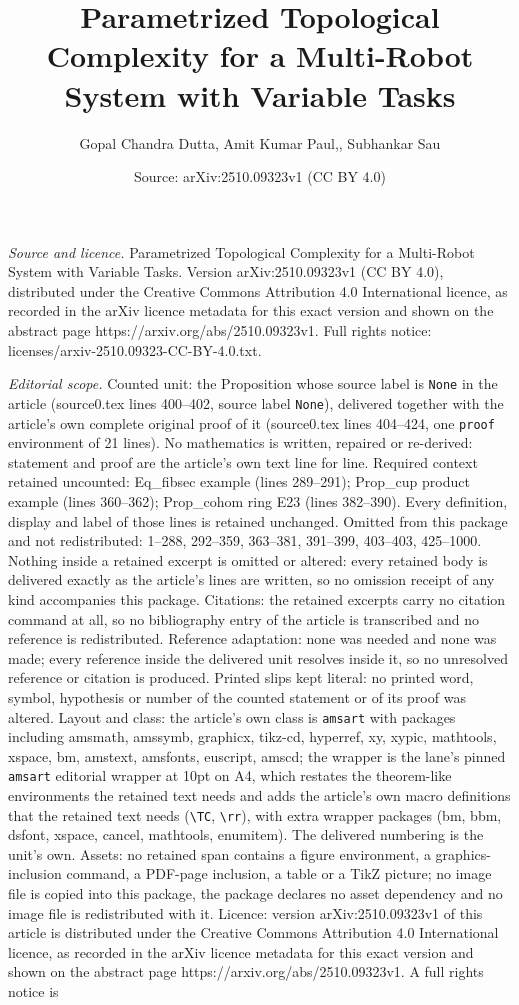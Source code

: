 \documentclass[10pt,a4paper]{amsart}
\title[Parametrized Topological Complexity for a Multi-Robot System]{Parametrized Topological Complexity for a Multi-Robot System with Variable Tasks}
\author{Gopal Chandra Dutta, Amit Kumar Paul,, Subhankar Sau}
\date{Source: arXiv:2510.09323v1 (CC BY 4.0)}
\begin{document}
\maketitle

\noindent\emph{Source and licence.} Parametrized Topological Complexity for a Multi-Robot System with Variable Tasks. Version arXiv:2510.09323v1 (CC BY 4.0), distributed under the Creative Commons Attribution 4.0 International licence, as recorded in the arXiv licence metadata for this exact version and shown on the abstract page https://arxiv.org/abs/2510.09323v1. Full rights notice: licenses/arxiv-2510.09323-CC-BY-4.0.txt.\par\smallskip

\noindent\textit{Editorial scope.} Counted unit: the Proposition whose source label is \texttt{None} in the article (source0.tex lines 400--402, source label \texttt{None}), delivered together with the article's own complete original proof of it (source0.tex lines 404--424, one \texttt{proof} environment of 21 lines). No mathematics is written, repaired or re-derived: statement and proof are the article's own text line for line. Required context retained uncounted: Eq\_fibsec example (lines 289--291); Prop\_cup product example (lines 360--362); Prop\_cohom ring E23 (lines 382--390). Every definition, display and label of those lines is retained unchanged. Omitted from this package and not redistributed: 1--288, 292--359, 363--381, 391--399, 403--403, 425--1000. Nothing inside a retained excerpt is omitted or altered: every retained body is delivered exactly as the article's lines are written, so no omission receipt of any kind accompanies this package. Citations: the retained excerpts carry no citation command at all, so no bibliography entry of the article is transcribed and no reference is redistributed. Reference adaptation: none was needed and none was made; every reference inside the delivered unit resolves inside it, so no unresolved reference or citation is produced. Printed slips kept literal: no printed word, symbol, hypothesis or number of the counted statement or of its proof was altered. Layout and class: the article's own class is \texttt{amsart} with packages including amsmath, amssymb, graphicx, tikz-cd, hyperref, xy, xypic, mathtools, xspace, bm, amstext, amsfonts, euscript, amscd; the wrapper is the lane's pinned \texttt{amsart} editorial wrapper at 10pt on A4, which restates the theorem-like environments the retained text needs and adds the article's own macro definitions that the retained text needs (\texttt{\textbackslash TC}, \texttt{\textbackslash rr}), with extra wrapper packages (bm, bbm, dsfont, xspace, cancel, mathtools, enumitem). The delivered numbering is the unit's own. Assets: no retained span contains a figure environment, a graphics-inclusion command, a PDF-page inclusion, a table or a TikZ picture; no image file is copied into this package, the package declares no asset dependency and no image file is redistributed with it. Licence: version arXiv:2510.09323v1 of this article is distributed under the Creative Commons Attribution 4.0 International licence, as recorded in the arXiv licence metadata for this exact version and shown on the abstract page https://arxiv.org/abs/2510.09323v1. A full rights notice is 
\end{document}

